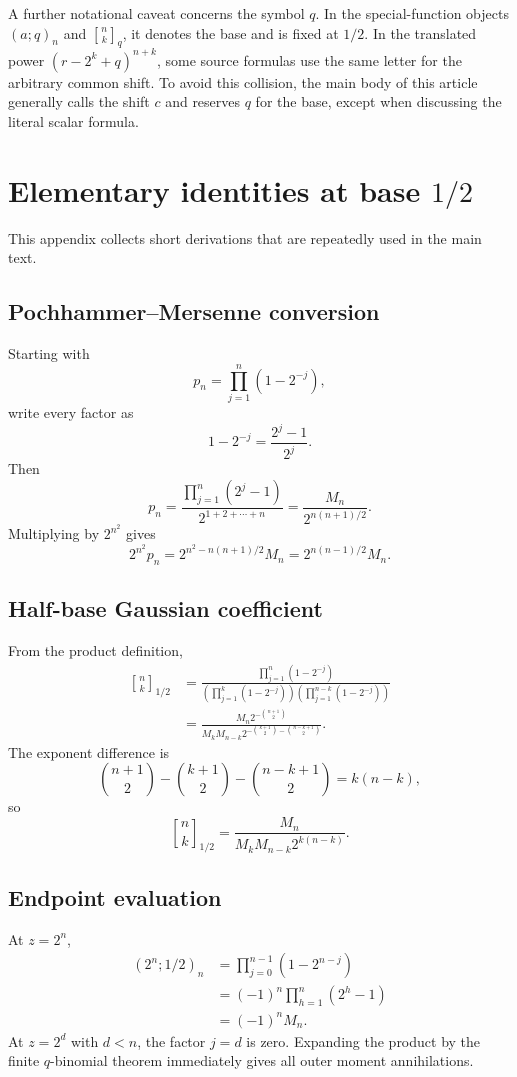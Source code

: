 \documentclass[11pt,oneside]{article}
\theoremstyle{definition}
\theoremstyle{remark}
\newcommand{\qpoch}[3]{\left(#1;#2\right)_{#3}}
\newcommand{\qbinom}[3]{{\genfrac{[}{]}{0pt}{}{#1}{#2}}_{#3}}
\newcommand{\halfqbinom}[2]{{\genfrac{[}{]}{0pt}{}{#1}{#2}}_{1/2}}
\begin{document}
A further notational caveat concerns the symbol $q$.  In the special-function
objects $\qpoch{a}{q}{n}$ and $\qbinom{n}{k}{q}$, it denotes the base and is
fixed at $1/2$.  In the translated power $(r-2^k+q)^{n+k}$, some source
formulas use the same letter for the arbitrary common shift.  To avoid this
collision, the main body of this article generally calls the shift $c$ and
reserves $q$ for the base, except when discussing the literal scalar formula.

\section{Elementary identities at base \texorpdfstring{$1/2$}{1/2}}

This appendix collects short derivations that are repeatedly used in the
main text.

\subsection{Pochhammer--Mersenne conversion}

Starting with
\[
 p_n=\prod_{j=1}^{n}(1-2^{-j}),
\]
write every factor as
\[
 1-2^{-j}=\frac{2^j-1}{2^j}.
\]
Then
\[
 p_n=\frac{\prod_{j=1}^{n}(2^j-1)}
 {2^{1+2+\cdots+n}}
 =\frac{M_n}{2^{n(n+1)/2}}.
\]
Multiplying by $2^{n^2}$ gives
\[
 2^{n^2}p_n
 =2^{n^2-n(n+1)/2}M_n
 =2^{n(n-1)/2}M_n.
\]

\subsection{Half-base Gaussian coefficient}

From the product definition,
\begin{align*}
 \halfqbinom{n}{k}
 &=\frac{\prod_{j=1}^{n}(1-2^{-j})}
 {\left(\prod_{j=1}^{k}(1-2^{-j})\right)
  \left(\prod_{j=1}^{n-k}(1-2^{-j})\right)}\\
 &=\frac{M_n2^{-\binom{n+1}{2}}}
 {M_kM_{n-k}
  2^{-\binom{k+1}{2}-\binom{n-k+1}{2}}}.
\end{align*}
The exponent difference is
\[
 \binom{n+1}{2}-\binom{k+1}{2}-\binom{n-k+1}{2}=k(n-k),
\]
so
\[
 \halfqbinom{n}{k}
 =\frac{M_n}{M_kM_{n-k}2^{k(n-k)}}.
\]

\subsection{Endpoint evaluation}

At $z=2^n$,
\begin{align*}
 \qpoch{2^n}{1/2}{n}
 &=\prod_{j=0}^{n-1}(1-2^{n-j})\\
 &=(-1)^n\prod_{h=1}^{n}(2^h-1)\\
 &=(-1)^nM_n.
\end{align*}
At $z=2^d$ with $d<n$, the factor $j=d$ is zero.  Expanding the product by
the finite $q$-binomial theorem immediately gives all outer moment
annihilations.
\end{document}

